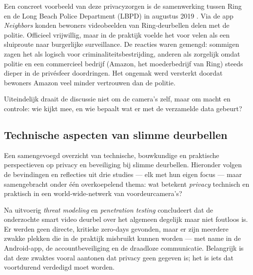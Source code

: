 \documentclass[nonacm,sigconf]{acmart}
\begin{document}
    Een concreet voorbeeld van deze privacyzorgen is de samenwerking tussen Ring en de Long Beach Police Department (LBPD) in augustus 2019 \parencite{shaffer2021applying}.
    Via de app \textit{Neighbors} konden bewoners videobeelden van Ring-deurbellen delen met de politie.
    Officieel vrijwillig, maar in de praktijk voelde het voor velen als een sluiproute naar burgerlijke surveillance.
    De reacties waren gemengd: sommigen zagen het als logisch voor criminaliteitsbestrijding, anderen als zorgelijk omdat politie en een commercieel bedrijf (Amazon, het moederbedrijf van Ring) steeds dieper in de privésfeer doordringen.
    Het ongemak werd versterkt doordat bewoners Amazon veel minder vertrouwen dan de politie.

    Uiteindelijk draait de discussie niet om de camera's zelf, maar om macht en controle: wie kijkt mee, en wie bepaalt wat er met de verzamelde data gebeurt?

    \subsection{Technische aspecten van slimme deurbellen}
    Een samengevoegd overzicht van technische, bouwkundige en praktische perspectieven op privacy en beveiliging bij slimme deurbellen. Hieronder volgen de bevindingen en reflecties uit drie studies — elk met hun eigen focus — maar samengebracht onder één overkoepelend thema: wat betekent \emph{privacy} technisch en praktisch in een world-wide-netwerk van voordeurcamera's?

    \parencite{liu2021ethical}

    Na uitvoerig \textit{threat modeling} en \textit{penetration testing} concludeert \parencite{liu2021ethical} dat de onderzochte smart video deurbel over het algemeen degelijk maar niet foutloos is. Er werden geen directe, kritieke zero-days gevonden, maar er zijn meerdere zwakke plekken die in de praktijk misbruikt kunnen worden — met name in de Android-app, de accountbeveiliging en de draadloze communicatie. Belangrijk is dat deze zwaktes vooral aantonen dat privacy geen gegeven is; het is iets dat voortdurend verdedigd moet worden.
\end{document}

